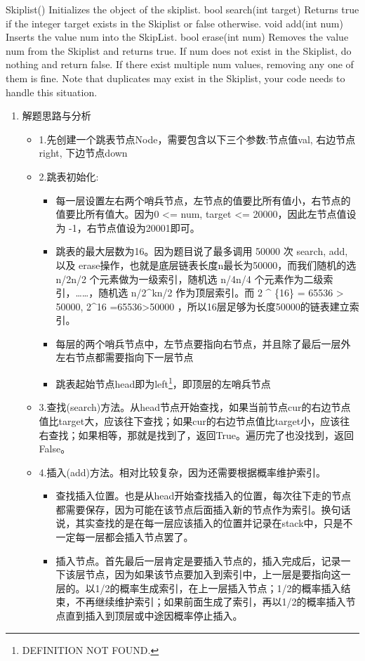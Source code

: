\documentclass[9pt, b5paaper]{book}
\begin{document}
Skiplist() Initializes the object of the skiplist.
bool search(int target) Returns true if the integer target exists in the Skiplist or false otherwise.
void add(int num) Inserts the value num into the SkipList.
bool erase(int num) Removes the value num from the Skiplist and returns true. If num does not exist in the Skiplist, do nothing and return false. If there exist multiple num values, removing any one of them is fine.
Note that duplicates may exist in the Skiplist, your code needs to handle this situation.
\begin{enumerate}
\item 解题思路与分析
\label{sec-1-10-1-1}
\begin{itemize}
\item 1.先创建一个跳表节点Node，需要包含以下三个参数:节点值val, 右边节点right, 下边节点down
\item 2.跳表初始化:
\begin{itemize}
\item 每一层设置左右两个哨兵节点，左节点的值要比所有值小，右节点的值要比所有值大。因为0 <= num, target <= 20000，因此左节点值设为 -1，右节点值设为20001即可。
\item 跳表的最大层数为16。因为题目说了最多调用 50000 次 search, add, 以及 erase操作，也就是底层链表长度n最长为50000，而我们随机的选 n/2n/2 个元素做为一级索引，随机选 n/4n/4 个元素作为二级索引，……，随机选 n/2\^{}kn/2 作为顶层索引。而 2 \^{} \{16\} = 65536 > 50000, 2\^{}16 =65536>50000 ，所以16层足够为长度50000的链表建立索引。
\item 每层的两个哨兵节点中，左节点要指向右节点，并且除了最后一层外左右节点都需要指向下一层节点
\item 跳表起始节点head即为left\footnote{DEFINITION NOT FOUND.}，即顶层的左哨兵节点
\end{itemize}
\item 3.查找(search)方法。从head节点开始查找，如果当前节点cur的右边节点值比target大，应该往下查找；如果cur的右边节点值比target小，应该往右查找；如果相等，那就是找到了，返回True。遍历完了也没找到，返回False。
\item 4.插入(add)方法。相对比较复杂，因为还需要根据概率维护索引。
\begin{itemize}
\item 查找插入位置。也是从head开始查找插入的位置，每次往下走的节点都需要保存，因为可能在该节点后面插入新的节点作为索引。换句话说，其实查找的是在每一层应该插入的位置并记录在stack中，只是不一定每一层都会插入节点罢了。
\item 插入节点。首先最后一层肯定是要插入节点的，插入完成后，记录一下该层节点，因为如果该节点要加入到索引中，上一层是要指向这一层的。以1/2的概率生成索引，在上一层插入节点；1/2的概率插入结束，不再继续维护索引；如果前面生成了索引，再以1/2的概率插入节点直到插入到顶层或中途因概率停止插入。

\end{itemize}
\end{itemize}
\end{enumerate}
\end{document}

